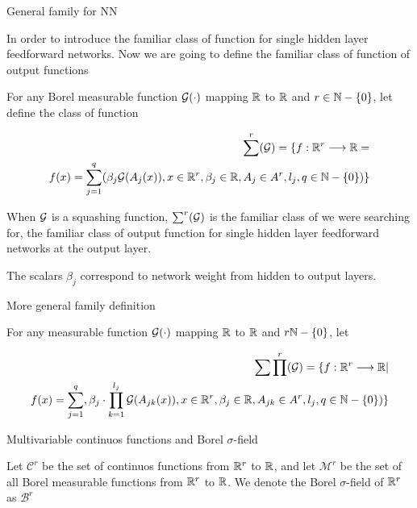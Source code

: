 \begin{definition} General family for NN

    In order to introduce the familiar class of function for single hidden layer feedforward networks. 
    Now we are going to define the familiar class of function of output functions 
    


    For any Borel measurable function $\mathcal{G}(\cdot)$ mapping $\mathbb{R}$ to $\mathbb{R}$ and 
    $r \in  \mathbb{N}-\{0\}$, let define the class of function 

    \begin{equation*}
        \begin{split}
        \sum ^r (\mathcal{G}) = \{ 
        f: \mathbb{R}^r \longrightarrow \mathbb{R} = \\
        f(x)=\sum_{j = 1} ^q (
        \beta_j \mathcal{G}(A_{j}(x)), 
        x  \in \mathbb{R}^r, \beta_j \in \mathbb{R}, A_{j}\in A^r, l_j,q \in \mathbb{N}-\{0\}
        )
        \}
    \end{split}
    \end{equation*}

    When $\mathcal{G}$ is a squashing function, $\sum ^r (\mathcal{G})$ is the familiar class of 
 we were searching for, the familiar class of output function for single hidden layer feedforward networks at the
 output layer. 
 
 The scalars $\beta_j$ correspond to network weight from hidden to output layers.
    
\end{definition}

\begin{definition} More general family definition 

    For any measurable function $\mathcal{G}(\cdot)$ mapping $\mathbb{R}$ to $\mathbb{R}$ and $r\mathbb{N}-\{0\}$, let 
    

    
    \begin{equation*}
        \begin{split}
        \sum \prod^r(\mathcal{G}) = \{ 
        f: \mathbb{R}^r \longrightarrow \mathbb{R} | \\
        f(x) = \sum_{j = 1} ^q , \beta_j \cdot \prod_{k=1}^{l_j}
        \mathcal{G}(A_{jk}(x)), 
        x  \in \mathbb{R}^r, \beta_j \in \mathbb{R}, A_{jk}\in A^r, l_j,q \in \mathbb{N}-\{0\}
        )
        \}
    \end{split}
    \end{equation*}

\end{definition}

\begin{definition} Multivariable continuos functions and Borel $\sigma$-field 

    Let $\mathcal C^r$ be the set of continuos functions from $\mathbb{R}^r$ to $\mathbb{R}$, and let $\mathcal M^r$ 
    be the set of all Borel measurable functions from $\mathbb{R}^r$ to $\mathbb{R}$. We denote the Borel 
    $\sigma$-field of $\mathbb{R}^r$ as $\mathcal B^r$
    
\end{definition}



